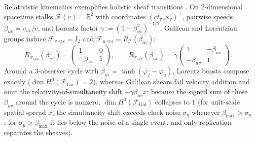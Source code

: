 \documentclass[11pt,a4paper]{article}
\theoremstyle{definition}
\theoremstyle{remark}
\newcommand{\R}{\mathbb{R}}
\begin{document}
Relativistic kinematics exemplifies holistic sheaf transitions \cite{gaukroger2012objectivity,churchland1979scientific,lopezpaz2026against,born1953physical,minkowski1952space,saunders2003physics,jacobs2021invariance,ursic2006einstein}. On $2$-dimensional spacetime stalks $\mathcal{F}(v) = \R^2$ with coordinates $(c t_v, x_v)^\top$, pairwise speeds $\beta_{uv} = v_{uv}/c$, and Lorentz factor $\gamma := (1 - \beta_{uv}^2)^{-1/2}$, Galilean and Lorentzian groups induce $\mathcal{F}_{v \trianglelefteq \epsilon} = I_2$ and $\mathcal{F}_{u \trianglelefteq \epsilon} = R_{\mathcal{T}}(\beta_{uv})$:
\begin{equation}
  R_{\mathcal{T}_{\mathrm{Gal}}}(\beta_{uv}) =
  \begin{pmatrix} 1 & 0 \\ -\beta_{uv} & 1 \end{pmatrix},
  \qquad
  R_{\mathcal{T}_{\mathrm{Lor}}}(\beta_{uv}) = \gamma
  \begin{pmatrix} 1 & -\beta_{uv} \\ -\beta_{uv} & 1 \end{pmatrix}.
  \label{eq:spacetime_maps}
\end{equation}
Around a $3$-observer cycle with $\beta_{uv} = \tanh(\varphi_v - \varphi_u)$, Lorentz boosts compose exactly ($\dim H^0(\mathcal{F}_{\mathrm{Lor}}) = 2$), whereas Galilean shears fail velocity addition and omit the relativity-of-simultaneity shift $-\gamma\beta_{uv} x$; because the signed sum of these $\beta_{uv}$ around the cycle is nonzero, $\dim H^0(\mathcal{F}_{\mathrm{Gal}})$ collapses to $1$ (for unit-scale spatial spread $x$, the simultaneity shift exceeds clock noise $\sigma_y$ whenever $\beta_{\max} > \sigma_y$; for $\sigma_y > \beta_{\max}$ it lies below the noise of a single event, and only replication separates the sheaves).
\end{document}
